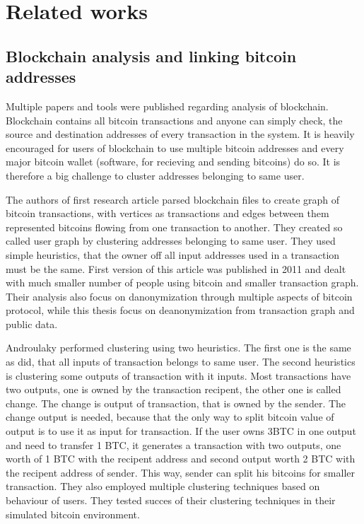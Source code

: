 \documentclass[
  digital, %
  table,   %
  lof,     %
  lot,     %
  oneside
]{fithesis3}
\begin{document}
\chapter{Related works}
\section{Blockchain analysis and linking bitcoin addresses}

Multiple papers and tools were published regarding analysis of blockchain.
Blockchain contains all bitcoin transactions and anyone can simply check,
the source and destination addresses of every transaction in the system.
It is heavily encouraged for users of blockchain to use multiple bitcoin addresses
 and every major bitcoin wallet (software, for recieving and sending bitcoins) do so.
 It is therefore a big challenge to cluster addresses belonging to same user.
 
The authors of first research article \parencite{reid2013analysis}
 parsed blockchain files to create graph of bitcoin transactions, with vertices as transactions
 and edges between them represented bitcoins flowing from one transaction to another.
 They created so called user graph by clustering addresses belonging to same user.
 They used simple heuristics, that the owner off all input addresses used
 in a transaction must be the same. First version of this article  
was published in 2011 and dealt with much smaller number of people using bitcoin and smaller transaction graph.
Their analysis also focus on danonymization through multiple aspects of bitcoin protocol,
while this thesis focus on deanonymization from transaction graph and public data.

Androulaky \parencite{androulaki2013evaluating} performed clustering using two heuristics.
The first one is the same as \parencite{reid2013analysis} did, that all inputs of transaction
belongs to same user. The second heuristics is clustering some outputs of transaction with it inputs.
Most transactions have two outputs, one is owned by the transaction recipent,
the other one is called change. The change is output of transaction, that is owned by
the sender. The change output is needed, because that the only way to split
 bitcoin value of output is to use it as input for transaction.
 If the user owns 3BTC in one output and need to transfer 1 BTC, it generates a transaction
 with two outputs, one worth of 1 BTC with the recipent address and second output worth 2 BTC 
 with the recipent address of sender. This way, sender can split his bitcoins for smaller transaction.
 They also employed multiple clustering techniques based on behaviour of users.
 They tested succes of their clustering techniques in their simulated bitcoin 
 environment.
\end{document}
